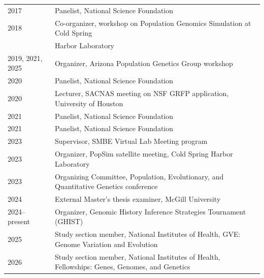 \documentclass[11pt]{article}
\begin{document}
\begin{longtable}[l]{l l}
2017 & Panelist, National Science Foundation\\%
2018 & Co-organizer, workshop on Population Genomics Simulation at Cold Spring\\
& Harbor Laboratory\\
2019, 2021, 2025 & Organizer, Arizona Population Genetics Group workshop\\
2020 & Panelist, National Science Foundation\\%
2020 & Lecturer, SACNAS meeting on NSF GRFP application, University of Houston\\
2021 & Panelist, National Science Foundation\\%
2021 & Panelist, National Science Foundation\\%
2023 & Supervisor, SMBE Virtual Lab Meeting program\\
2023 & Organizer, PopSim satellite meeting, Cold Spring Harbor Laboratory\\
2023 & Organizing Committee, Population, Evolutionary, and Quantitative Genetics conference\\
2024 & External Master's thesis examiner, McGill University\\
2024--present & Organizer, Genomic History Inference Strategies Tournament (GHIST)\\
2025 & Study section member, National Institutes of Health, GVE: Genome Variation and Evolution\\
2026 & Study section member, National Institutes of Health, Fellowships: Genes, Genomes, and Genetics
\end{longtable}
\end{document}
